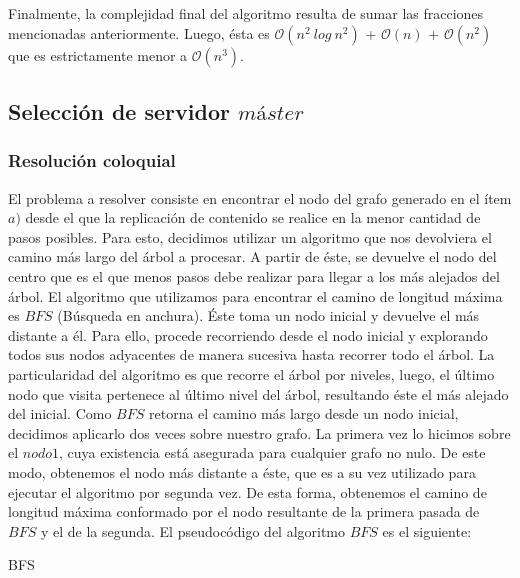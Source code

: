 \begin{itemize}
\begin{itemize}
\end{itemize}

 Finalmente, la complejidad final del algoritmo resulta de sumar las fracciones mencionadas anteriormente. Luego, ésta es $\mathcal{O}(n^{2}\ log\ n^{2})$ + $\mathcal{O}(n)$ + $\mathcal{O}(n^{2})$ que es estrictamente menor a $\mathcal{O}(n^{3})$.

\subsection{Selección de servidor $máster$}

\subsubsection{Resolución coloquial}
El problema a resolver consiste en encontrar el nodo del grafo generado en el ítem $a)$ desde el que la replicación de contenido se realice en la menor cantidad de pasos posibles. Para esto, decidimos utilizar un algoritmo que nos devolviera el camino más largo del árbol a procesar. A partir de éste, se devuelve el nodo del centro que es el que menos pasos debe realizar para llegar a los más alejados del árbol.\newline
\newline
El algoritmo que utilizamos para encontrar el camino de longitud máxima es $BFS$ (Búsqueda en anchura). Éste toma un nodo inicial y devuelve el más distante a él. Para ello, procede recorriendo desde el nodo inicial y explorando todos sus nodos adyacentes de manera sucesiva hasta recorrer todo el árbol. La particularidad del algoritmo es que recorre el árbol por niveles, luego, el último nodo que visita pertenece al último nivel del árbol, resultando éste el más alejado del inicial.\newline
\newline
Como $BFS$ retorna el camino más largo desde un nodo inicial, decidimos aplicarlo dos veces sobre nuestro grafo. La primera vez lo hicimos sobre el $nodo 1$, cuya existencia está asegurada para cualquier grafo no nulo. De este modo, obtenemos el nodo más distante a éste, que es a su vez utilizado para ejecutar el algoritmo por segunda vez. De esta forma, obtenemos el camino de longitud máxima conformado por el nodo resultante de la primera pasada de $BFS$ y el de la segunda.\newline
\newline
El pseudocódigo del algoritmo $BFS$ es el siguiente:\newline
\newline
\begin{algorithm}[H]
	\SetAlgoLined
	\caption{BFS}
	

\end{algorithm}
\end{itemize}
